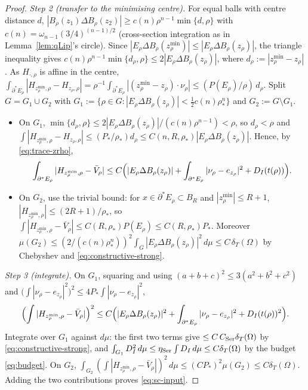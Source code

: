 \documentclass[11pt]{amsart}
\theoremstyle{definition}
\newcommand{\Om}{\Omega}
\newcommand{\dT}{\delta_T}
\newcommand{\rstar}{\rho_*}
\newcommand{\Per}{P}
\begin{document}
\begin{proof}
\smallskip\noindent\emph{Step 2 (transfer to the minimising centre).}
For equal balls with centre distance \(d\),
\(|B_\rho(z_1)\Delta B_\rho(z_2)|\ge c(n)\rho^{n-1}\min\{d,\rho\}\) with
\(c(n)=\omega_{n-1}(3/4)^{(n-1)/2}\) (cross-section integration as in
Lemma~\ref{lem:qLip}'s circle).  Since
\(|E_\rho\Delta B_\rho(z_\rho^{\min})|\le|E_\rho\Delta B_\rho(z_\rho)|\), the
triangle inequality gives
\(c(n)\rho^{n-1}\min\{d_\rho,\rho\}\le2|E_\rho\Delta B_\rho(z_\rho)|\), where
\(d_\rho:=|z_\rho^{\min}-z_\rho|\).  As \(H_{\cdot,\rho}\) is affine in the
centre, \(\int_{\partial^*E_\rho}|H_{z_\rho^{\min},\rho}-H_{z_\rho,\rho}|
=\rho^{-1}\!\int_{\partial^*E_\rho}|(z_\rho^{\min}-z_\rho)\cdot\nu_\rho|
\le(\Per(E_\rho)/\rho)\,d_\rho\).  Split \(G=G_1\cup G_2\) with
\(G_1:=\{\rho\in G:|E_\rho\Delta B_\rho(z_\rho)|<\tfrac12 c(n)\rstar^{n}\}\)
and \(G_2:=G\setminus G_1\).
\begin{itemize}[leftmargin=2em]
\item On \(G_1\), \(\min\{d_\rho,\rho\}\le2|E_\rho\Delta B_\rho(z_\rho)|/
(c(n)\rho^{n-1})<\rho\), so \(d_\rho<\rho\) and
\(\int|H_{z_\rho^{\min},\rho}-H_{z_\rho,\rho}|\le
(P_*/\rstar)d_\rho\le C(n,R,\rstar)|E_\rho\Delta B_\rho(z_\rho)|\).  Hence, by
\eqref{eq:trace-zrho},
\[
   \int_{\partial^*E_\rho}|H_{z_\rho^{\min},\rho}-\bar V_\rho|
   \le C\Bigl(|E_\rho\Delta B_\rho(z_\rho)|
   +\int_{\partial^*E_\rho}|\nu_\rho-e_{z_\rho}|^2+D_I(t(\rho))\Bigr).
\]
\item On \(G_2\), use the trivial bound: for \(x\in\partial^*E_\rho\subset B_R\)
and \(|z_\rho^{\min}|\le R+1\), \(|H_{z_\rho^{\min},\rho}|\le(2R+1)/\rstar\), so
\(\int|H_{z_\rho^{\min},\rho}-\bar V_\rho|\le C(R,\rstar)\Per(E_\rho)\le
C(R,\rstar)P_*\).  Moreover \(\mu(G_2)\le
(2/(c(n)\rstar^n))^2\int_{G}|E_\rho\Delta B_\rho(z_\rho)|^2\,d\mu\le
C\,\dT(\Om)\) by Chebyshev and \eqref{eq:constructive-strong}.
\end{itemize}

\smallskip\noindent\emph{Step 3 (integrate).}
On \(G_1\), squaring and using \((a+b+c)^2\le3(a^2+b^2+c^2)\) and
\(\bigl(\int|\nu_\rho-e_{z_\rho}|^2\bigr)^2\le4P_*\int|\nu_\rho-e_{z_\rho}|^2\),
\[
   \Bigl(\int|H_{z_\rho^{\min},\rho}-\bar V_\rho|\Bigr)^2
   \le C\Bigl(|E_\rho\Delta B_\rho(z_\rho)|^2
   +\int_{\partial^*E_\rho}|\nu_\rho-e_{z_\rho}|^2
   +D_I(t(\rho))^2\Bigr).
\]
Integrate over \(G_1\) against \(d\mu\): the first two terms give
\(\le C\,C_{\rm Ser}\dT(\Om)\) by \eqref{eq:constructive-strong}, and
\(\int_{G_1}D_I^2\,d\mu\le\eta_{\rm Ser}\int D_I\,d\mu\le C\dT(\Om)\) by the
budget \eqref{eq:budget}.  On \(G_2\),
\(\int_{G_2}(\int|H_{z_\rho^{\min},\rho}-\bar V_\rho|)^2\,d\mu\le
(C P_*)^2\mu(G_2)\le C\dT(\Om)\).  Adding the two contributions proves
\eqref{eq:sc-input}.
\end{proof}
\end{document}
